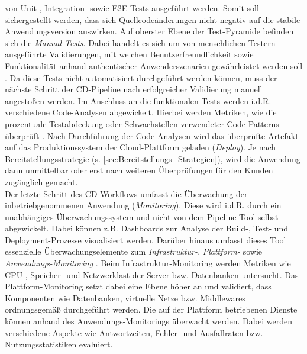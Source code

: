 von Unit-, Integration- sowie E2E-Tests ausgeführt werden. Somit soll sichergestellt werden, dass sich Quellcodeänderungen nicht negativ auf die stabile Anwendungsversion auswirken. Auf oberster Ebene der Test-Pyramide befinden sich die \textit{Manual-Tests}. Dabei handelt es sich um von menschlichen Testern ausgeführte Validierungen, mit welchen Benutzerfreundlichkeit sowie Funktionalität anhand authentischer Anwenderszenarien gewährleistet werden soll \cite{Guru99.2020}. Da diese Tests nicht automatisiert durchgeführt werden können, muss der nächste Schritt der CD-Pipeline nach erfolgreicher Validierung manuell angestoßen werden. Im Anschluss an die funktionalen Tests werden i.d.R. verschiedene Code-Analysen abgewickelt. Hierbei werden Metriken, wie die prozentuale Testabdeckung oder Sch\-wachstellen verwendeter Code-Patterns überprüft \cite[146]{Rangnau.10520201082020}. Nach Durchführung der Code-Analysen wird das überprüfte Artefakt auf das Produktionssystem der Cloud-Plattform geladen (\textit{Deploy}). Je nach Bereitstellungsstrategie (s. \ref{sec:Bereitstellungs_Strategien}), wird die Anwendung dann unmittelbar oder erst nach weiteren Überprüfungen für den Kunden zugänglich gemacht.\\ Der letzte Schritt des CD-Workflows umfasst die Überwachung der inbetriebgenommenen Anwendung (\textit{Monitoring}). Diese wird i.d.R. durch ein unabhängiges Überwachungssystem und nicht von dem Pipeline-Tool selbst abgewickelt. Dabei können z.B. Dashboards zur Analyse der Build-, Test- und Deployment-Prozesse visualisiert werden. Darüber hinaus umfasst dieses Tool essenzielle Überwachungsele\-mente zum \textit{Infrastruktur-}, \textit{Plattform-} sowie \textit{Anwendungs-Monitoring} \cite{VMware.2022} \cite{Datadog.2021}\cite{.2023}. Beim Infra\-struktur-Monitoring werden Metriken wie CPU-, Speicher- und Netz\-werklast der Server bzw. Datenbanken untersucht. Das Plattform-Monitoring setzt dabei eine Ebene höher an und validiert, dass Komponenten wie Datenbanken, virtuelle Netze bzw. Middlewares ordnungsgemäß durchgeführt werden. Die auf der Plattform betriebenen Dienste können anhand des Anwendungs-Monitorings überwacht werden. Dabei werden verschiedene Aspekte wie Antwortzeiten, Fehler- und Ausfallraten bzw. Nutzungsstatistiken evaluiert.\\ 
